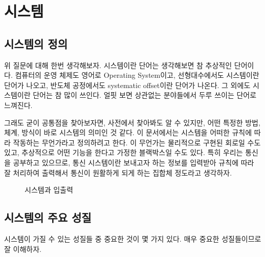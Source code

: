 \section{시스템}
\subsection{시스템의 정의}
위 질문에 대해 한번 생각해보자. 시스템이란 단어는 생각해보면 참 추상적인 단어이다. 
컴퓨터의 운영 체제도 영어로 Operating System이고, 선형대수에서도 시스템이란 단어가 나오고, 반도체 공정에서도 systematic offset이란 단어가 나온다.
그 외에도 시스템이란 단어는 참 많이 쓰인다. 얼핏 보면 상관없는 분야들에서 두루 쓰이는 단어로 느껴진다.
\par
그래도 굳이 공통점을 찾아보자면, 사전에서 찾아봐도 알 수 있지만, 어떤 특정한 방법, 체계, 방식이 바로 시스템의 의미인 것 같다.
이 문서에서는 시스템을 어떠한 규칙에 따라 작동하는 무언가라고 정의하려고 한다.
이 무언가는 물리적으로 구현된 회로일 수도 있고, 추상적으로 어떤 기능을 한다고 가정한 블랙박스일 수도 있다.
특히 우리는 통신을 공부하고 있으므로, 통신 시스템이란 보내고자 하는 정보를 입력받아 규칙에 따라 잘 처리하여 출력해서 통신이 원활하게 되게 하는 집합체 정도라고 생각하자.
\begin{figure}[!hpb]
    \centering
    \caption{시스템과 입출력}\label{fig:system and io}
\end{figure}
\subsection{시스템의 주요 성질}
시스템이 가질 수 있는 성질들 중 중요한 것이 몇 가지 있다. 매우 중요한 성질들이므로 잘 이해하자.
